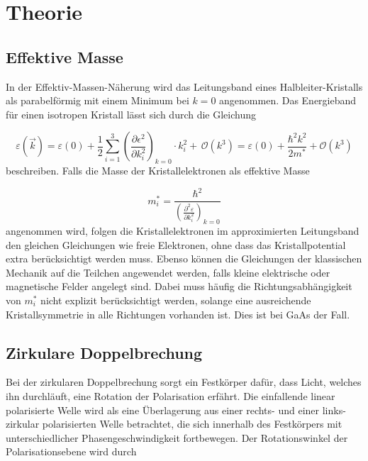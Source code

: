 \section{Theorie}
\label{sec:Theorie}

        \subsection{Effektive Masse}

            In der Effektiv-Massen-Näherung wird das Leitungsband eines Halbleiter-Kristalls 
            als parabelförmig mit einem Minimum bei $k=0$ angenommen. Das Energieband 
            für einen isotropen Kristall lässt sich durch die Gleichung 

            \begin{equation}
                \varepsilon(\vec{k}) = \varepsilon(0) + \frac{1}{2}\sum_{i=1}^3
                \left(\frac{\partial \epsilon^2}{\partial k_i^2}\right)_{k=0}\cdot k_i^2 + \,
                \mathcal{O}(k^3) = \varepsilon(0) + \frac{\hbar^2k^2}{2m^*} + \mathcal{O}(k^3)
            \end{equation} 
            beschreiben. Falls die Masse der Kristallelektronen als effektive Masse 

            \begin{equation}
                m_i^* = \frac{\hbar^2}{\left(\frac{\partial^2\varepsilon}{\partial k_i^2} \right)_{k=0}}
            \end{equation}
            angenommen wird, folgen die Kristallelektronen im approximierten Leitungsband 
            den gleichen Gleichungen wie freie Elektronen, ohne dass das Kristallpotential 
            extra berücksichtigt werden muss. Ebenso können die Gleichungen der klassischen Mechanik
            auf die Teilchen angewendet werden, falls kleine elektrische oder magnetische 
            Felder angelegt sind.
            Dabei muss h\"aufig die Richtungsabh\"angigkeit von $m_i^*$ nicht explizit 
            ber\"ucksichtigt werden, solange eine ausreichende Kristallsymmetrie in 
            alle Richtungen vorhanden ist. Dies ist bei GaAs der Fall.

        \subsection{Zirkulare Doppelbrechung}

            Bei der zirkularen Doppelbrechung sorgt ein Festkörper dafür, dass Licht, welches 
            ihn durchläuft, eine Rotation der Polarisation erfährt. Die einfallende linear polarisierte 
            Welle wird als eine Überlagerung aus einer rechts- und einer links-zirkular polarisierten 
            Welle betrachtet, die sich innerhalb des Festkörpers mit unterschiedlicher Phasengeschwindigkeit
            fortbewegen. Der Rotationswinkel der Polarisationsebene wird durch

